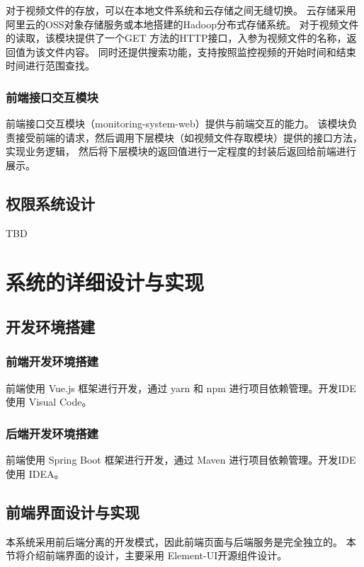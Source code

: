 对于视频文件的存放，可以在本地文件系统和云存储之间无缝切换。
云存储采用阿里云的OSS对象存储服务或本地搭建的Hadoop分布式存储系统。
对于视频文件的读取，该模块提供了一个GET 方法的HTTP接口，入参为视频文件的名称，返回值为该文件内容。
同时还提供搜索功能，支持按照监控视频的开始时间和结束时间进行范围查找。


\subsection{前端接口交互模块}
前端接口交互模块（monitoring-system-web）提供与前端交互的能力。
该模块负责接受前端的请求，然后调用下层模块（如视频文件存取模块）提供的接口方法，实现业务逻辑，
然后将下层模块的返回值进行一定程度的封装后返回给前端进行展示。





\section{权限系统设计}
TBD



\chapter{系统的详细设计与实现}
\section{开发环境搭建}
\subsection{前端开发环境搭建}
前端使用 Vue.js 框架进行开发，通过 yarn 和 npm 进行项目依赖管理。开发IDE使用 Visual Code。 

\subsection{后端开发环境搭建}
前端使用 Spring Boot 框架进行开发，通过 Maven 进行项目依赖管理。开发IDE使用 IDEA。 

\section{前端界面设计与实现}
本系统采用前后端分离的开发模式，因此前端页面与后端服务是完全独立的。
本节将介绍前端界面的设计，主要采用 Element-UI开源组件设计。

